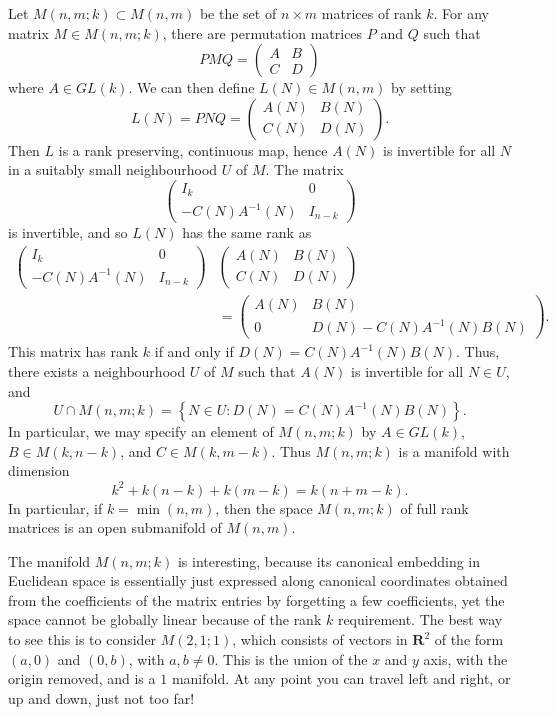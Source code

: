\begin{example}
    Let $M(n,m;k) \subset M(n,m)$ be the set of $n \times m$ matrices of rank $k$. For any matrix $M \in M(n,m;k)$, there are permutation matrices $P$ and $Q$ such that
    \[ PMQ = \begin{pmatrix} A & B \\ C & D \end{pmatrix} \]
    where $A \in GL(k)$. We can then define $L(N) \in M(n,m)$ by setting
    \[ L(N) = PNQ = \begin{pmatrix} A(N) & B(N) \\ C(N) & D(N) \end{pmatrix}. \]
    Then $L$ is a rank preserving, continuous map, hence $A(N)$ is invertible for all $N$ in a suitably small neighbourhood $U$ of $M$. The matrix
    \[ \begin{pmatrix} I_k & 0 \\ -C(N)A^{-1}(N) & I_{n-k} \end{pmatrix} \]
    is invertible, and so $L(N)$ has the same rank as
    \begin{align*}
        \begin{pmatrix} I_k & 0 \\ -C(N)A^{-1}(N) & I_{n-k} \end{pmatrix} &\begin{pmatrix} A(N) & B(N) \\ C(N) & D(N) \end{pmatrix}\\
        &= \begin{pmatrix} A(N) & B(N) \\ 0 & D(N) - C(N)A^{-1}(N)B(N) \end{pmatrix}.
    \end{align*}
    This matrix has rank $k$ if and only if $D(N) = C(N)A^{-1}(N)B(N)$. Thus, there exists a neighbourhood $U$ of $M$ such that $A(N)$ is invertible for all $N \in U$, and
    \[ U \cap M(n,m;k) = \left\{ N \in U : D(N) = C(N) A^{-1}(N) B(N) \right\}. \]
    In particular, we may specify an element of $M(n,m;k)$ by $A \in GL(k)$, $B \in M(k,n-k)$, and $C \in M(k,m-k)$. Thus $M(n,m;k)$ is a manifold with dimension
    \[ k^2 + k(n-k) + k(m-k) = k(n+m-k). \]
    In particular, if $k = \min(n,m)$, then the space $M(n,m;k)$ of full rank matrices is an open submanifold of $M(n,m)$.
\end{example}

The manifold $M(n,m;k)$ is interesting, because its canonical embedding in Euclidean space is essentially just expressed along canonical coordinates obtained from the coefficients of the matrix entries by forgetting a few coefficients, yet the space cannot be globally linear because of the rank $k$ requirement. The best way to see this is to consider $M(2,1;1)$, which consists of vectors in $\mathbf{R}^2$ of the form $(a,0)$ and $(0,b)$, with $a,b \neq 0$. This is the union of the $x$ and $y$ axis, with the origin removed, and is a $1$ manifold. At any point you can travel left and right, or up and down, just not too far!

